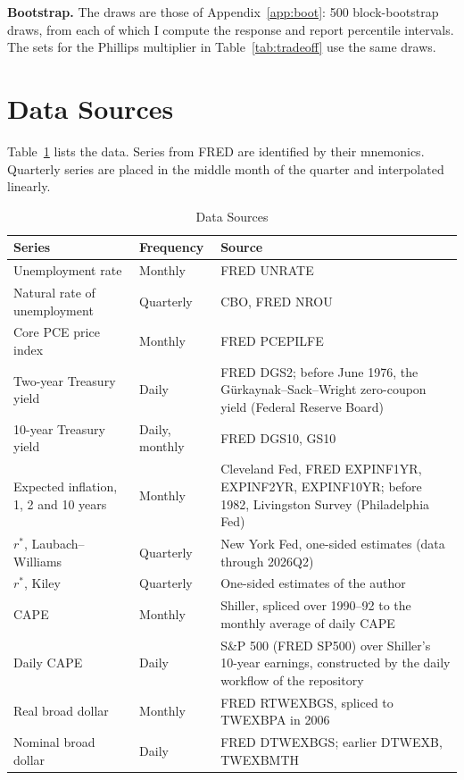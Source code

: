 \documentclass[11pt]{article}
\newcommand{\rs}{r^{*}}
\begin{document}
\begin{appendices}
\textbf{Bootstrap.} The draws are those of Appendix~\ref{app:boot}: 500 block-bootstrap draws, from each of which I compute the response and report percentile intervals. The sets for the Phillips multiplier in Table~\ref{tab:tradeoff} use the same draws.

\FloatBarrier
\section{Data Sources}\label{app:data}
Table~\ref{tab:data} lists the data. Series from FRED are identified by their mnemonics. Quarterly series are placed in the middle month of the quarter and interpolated linearly.

\begin{table}[tp]\centering\small
\caption{Data Sources}\label{tab:data}
\begin{tabular}{p{}p{}p{}}\toprule
Series & Frequency & Source \\\midrule
Unemployment rate & Monthly & FRED UNRATE \\
Natural rate of unemployment & Quarterly & CBO, FRED NROU \\
Core PCE price index & Monthly & FRED PCEPILFE \\
Two-year Treasury yield & Daily & FRED DGS2; before June 1976, the Gürkaynak--Sack--Wright zero-coupon yield \citep{gurkaynak2007} (Federal Reserve Board) \\
10-year Treasury yield & Daily, monthly & FRED DGS10, GS10 \\
Expected inflation, 1, 2 and 10 years & Monthly & Cleveland Fed, FRED EXPINF1YR, EXPINF2YR, EXPINF10YR; before 1982, Livingston Survey (Philadelphia Fed) \\
$\rs$, Laubach--Williams & Quarterly & New York Fed, one-sided estimates (data through 2026Q2) \\
$\rs$, Kiley & Quarterly & One-sided estimates of the author \\
CAPE & Monthly & Shiller, spliced over 1990--92 to the monthly average of daily CAPE \\
Daily CAPE & Daily & S\&P 500 (FRED SP500) over Shiller's 10-year earnings, constructed by the daily workflow of the repository \\
Real broad dollar & Monthly & FRED RTWEXBGS, spliced to TWEXBPA in 2006 \\
Nominal broad dollar & Daily & FRED DTWEXBGS; earlier DTWEXB, TWEXBMTH \\

\end{tabular}
\end{table}
\end{appendices}
\end{document}
